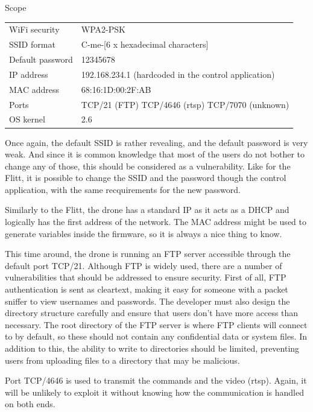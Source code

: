 \begin{chaptercover}{Scope}
\begingroup
\renewcommand*{\arraystretch}{1.3}
\begin{center}
\begin{tabular}{L{4cm}L{10cm}}
  WiFi security & WPA2-PSK \\
  SSID format & C-me-[6 x hexadecimal characters] \\
  Default password & 12345678 \\
  IP address & 192.168.234.1 (hardcoded in the control application) \\
  MAC address & 68:16:1D:00:2F:AB \\
  Ports & TCP/21 (FTP) \newline TCP/4646 (\acrshort{rtsp}) \newline TCP/7070 (unknown) \\
  OS kernel & 2.6 \\
\end{tabular}
\end{center}
\endgroup

Once again, the default SSID is rather revealing, and the default password is very weak. And since it is common knowledge that most of the users do not bother to change any of those, this should be considered as a vulnerability. Like for the Flitt, it is possible to change the SSID and the password though the control application, with the same recquirements for the new password.

Similarly to the Flitt, the drone has a standard IP as it acts as a DHCP and logically has the first address of the network. The MAC address might be used to generate variables inside the firmware, so it is always a nice thing to know.

This time around, the drone is running an FTP server accessible through the default port TCP/21. Although FTP is widely used, there are a number of vulnerabilities that should be addressed to ensure security. First of all, FTP authentication is sent as cleartext, making it easy for someone with a packet sniffer to view usernames and passwords. The developer must also design the directory structure carefully and ensure that users don't have more access than necessary. The root directory of the FTP server is where FTP clients will connect to by default, so these should not contain any confidential data or system files. In addition to this, the ability to write to directories should be limited, preventing users from uploading files to a directory that may be malicious.

Port TCP/4646 is used to transmit the commands and the video (\acrshort{rtsp}). Again, it will be unlikely to exploit it without knowing how the communication is handled on both ends.


\end{chaptercover}

